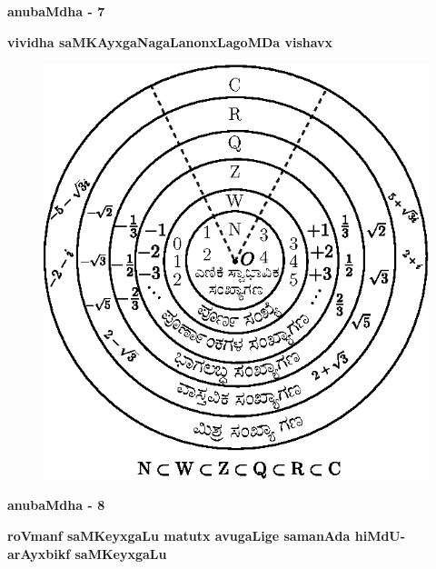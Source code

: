 \newpage

\begin{center}
{\huge\bf anubaMdha - 7}
\bigskip

{\large\bf vividha saMKAyxgaNagaLanonxLagoMDa vishavx}
\smallskip

{\large\bf {}}
\end{center}

\begin{figure}[H]
\centering
\includegraphics{figures/app25.eps}
\end{figure}

\newpage

\begin{center}
{\huge\bf anubaMdha - 8}
\bigskip

{\large\bf roVmanf saMKeyxgaLu matutx avugaLige samanAda hiMdU-arAyxbikf saMKeyxgaLu}
\smallskip

{\large\bf {}}
\end{center}

